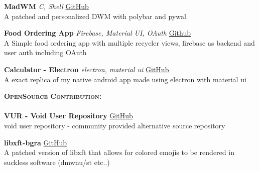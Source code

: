 \documentclass[a4paper]{article}
\newcommand{\lineunder} {
    \vspace*{-8pt} \\
    \hspace*{-18pt} \hrulefill \\
}
\newcommand{\header} [1] {
    {\hspace*{-18pt}\vspace*{6pt} \textsc{#1} }
    \vspace*{-6pt} \lineunder
}
\begin{document}
{\textbf{MadWM}} {\sl C, Shell} 
    \hfill \href{https://github.com/MadFlasheroo7/madwm}{GitHub}\\
    A patched and personalized DWM with polybar and pywal\\
\vspace*{2mm}

{\textbf{Food Ordering App}} {\sl Firebase, Material UI, OAuth} 
    \hfill \href{https://github.com/MadFlasheroo7/Cloud\_Backend}{Github}\\
    A Simple food ordering app with multiple recycler views, firebase as backend and user auth including OAuth\\
\vspace*{2mm}

{\textbf{Calculator - Electron}} {\sl electron, material ui} 
    \hfill \href{https://github.com/MadFlasheroo7/calculator-electron}{GitHub}\\
    A exact replica of my native android app made using electron with material ui\\
\vspace*{2mm}

\header{\textbf{OpenSource Contribution:}}
\textbf{VUR - Void User Repository} 
    \hfill \href{https://github.com/MadFlasheroo7/VUR}{GitHub}\\
    void user repository - community provided alternative source repository\\
\vspace*{2mm}

\textbf{libxft-bgra} 
    \hfill \href{https://github.com/MadFlasheroo7/libxft-bgra}{GitHub}\\
    A patched version of libxft that allows for colored emojis to be rendered in suckless software (dmwnu/st etc..)\\
\vspace*{2mm}
\end{document}
